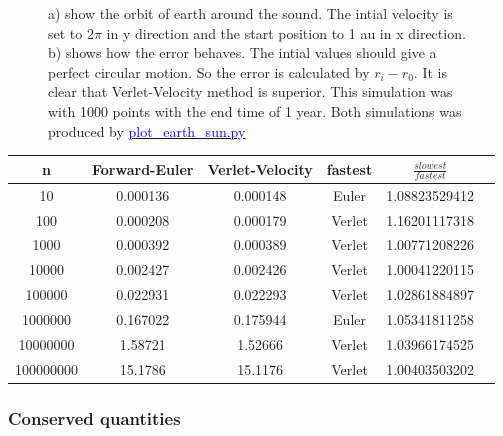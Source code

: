 \begin{figure}[H]
\begin{subfigure}{0.5\textwidth}
        \caption{}
    \end{subfigure}
    \caption{a) show the orbit of earth around the sound. The intial velocity is set to $2\pi$ in y direction and the start position to 1 au in x direction. b) shows how the error behaves. The intial values should give a perfect circular motion. So the error is calculated by $r_i - r_{0}$. It is clear that Verlet-Velocity method is superior. This simulation was with 1000 points with the end time of 1 year. Both simulations was produced by \href{https://github.com/erikfsk/Project-3/blob/master/Project3/3a/plot_earth_sun.py}{\textcolor{blue}{plot\_earth\_sun.py}}}
    \label{fig:earth-sun}
\end{figure}

\begin{tabular}{|c|c|c|c|c|c|}
	\hline 
	n & Forward-Euler & Verlet-Velocity &  fastest & $\frac{slowest}{fastest}$\\ 
	\hline
	10 & 0.000136 & 0.000148 & Euler &   1.08823529412   \\ 
	\hline 
	100 & 0.000208 & 0.000179 & Verlet &   1.16201117318   \\ 
	\hline 
	1000 & 0.000392 & 0.000389 & Verlet &  1.00771208226   \\ 
	\hline
	10000 & 0.002427 & 0.002426 & Verlet &   1.00041220115  \\ 
	\hline
	100000 & 0.022931 & 0.022293 & Verlet &   1.02861884897   \\ 
	\hline
	1000000 & 0.167022 & 0.175944 & Euler &   1.05341811258  \\ 
	\hline
	10000000 & 1.58721 & 1.52666 & Verlet &   1.03966174525  \\ 
	\hline
	100000000 & 15.1786 & 15.1176 & Verlet &   1.00403503202  \\ 
	\hline
\end{tabular}



\subsubsection{Conserved quantities}


